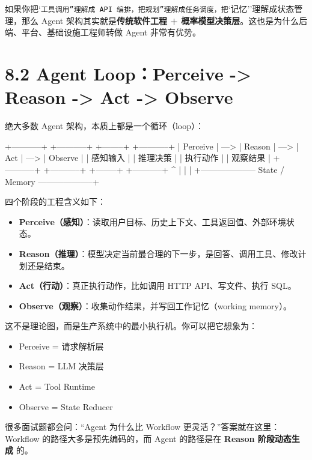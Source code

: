 如果你把`\texttt{工具调用''理解成 API 编排，把}\texttt{规划''理解成任务调度，把}`记忆''理解成状态管理，那么 Agent 架构其实就是\textbf{传统软件工程 + 概率模型决策层}。这也是为什么后端、平台、基础设施工程师转做 Agent 非常有优势。


\section{8.2 Agent Loop：Perceive -> Reason -> Act -> Observe}

绝大多数 Agent 架构，本质上都是一个循环（loop）：


\begin{codeblock}
+-----------+      +-----------+      +--------+      +-----------+
| Perceive  | ---> |  Reason   | ---> |  Act   | ---> |  Observe  |
| 感知输入   |      | 推理决策    |      | 执行动作 |      | 观察结果    |
+-----------+      +-----------+      +--------+      +-----------+
      ^                                                        |
      |                                                        |
      +-------------------- State / Memory --------------------+
\end{codeblock}

四个阶段的工程含义如下：


\begin{itemize}[leftmargin=2em]
\item \textbf{Perceive（感知）}：读取用户目标、历史上下文、工具返回值、外部环境状态。
\item \textbf{Reason（推理）}：模型决定当前最合理的下一步，是回答、调用工具、修改计划还是结束。
\item \textbf{Act（行动）}：真正执行动作，比如调用 HTTP API、写文件、执行 SQL。
\item \textbf{Observe（观察）}：收集动作结果，并写回工作记忆（working memory）。
\end{itemize}

这不是理论图，而是生产系统中的最小执行机。你可以把它想象为：


\begin{itemize}[leftmargin=2em]
\item Perceive = 请求解析层
\item Reason = LLM 决策层
\item Act = Tool Runtime
\item Observe = State Reducer
\end{itemize}

很多面试题都会问：``Agent 为什么比 Workflow 更灵活？''答案就在这里：Workflow 的路径大多是预先编码的，而 Agent 的路径是在 \textbf{Reason 阶段动态生成} 的。


